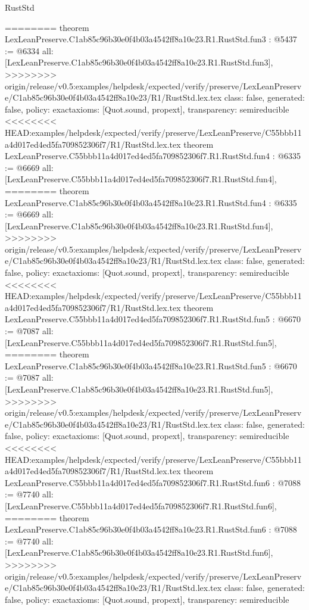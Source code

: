 \begin{lexlean}{RustStd}
\begin{coremodule}
{\begin{coremodule}
{{{{{{========
theorem LexLeanPreserve.C1ab85c96b30e0f4b03a4542ff8a10e23.R1.RustStd.fun3 : @5437 := @6334 {
  all: [LexLeanPreserve.C1ab85c96b30e0f4b03a4542ff8a10e23.R1.RustStd.fun3],
>>>>>>>> origin/release/v0.5:examples/helpdesk/expected/verify/preserve/LexLeanPreserve/C1ab85c96b30e0f4b03a4542ff8a10e23/R1/RustStd.lex.tex
  class: false,
  generated: false,
  policy: exact{axioms: [Quot.sound, propext]},
  transparency: semireducible
}
<<<<<<<< HEAD:examples/helpdesk/expected/verify/preserve/LexLeanPreserve/C55bbb11a4d017ed4ed5fa709852306f7/R1/RustStd.lex.tex
theorem LexLeanPreserve.C55bbb11a4d017ed4ed5fa709852306f7.R1.RustStd.fun4 : @6335 := @6669 {
  all: [LexLeanPreserve.C55bbb11a4d017ed4ed5fa709852306f7.R1.RustStd.fun4],
========
theorem LexLeanPreserve.C1ab85c96b30e0f4b03a4542ff8a10e23.R1.RustStd.fun4 : @6335 := @6669 {
  all: [LexLeanPreserve.C1ab85c96b30e0f4b03a4542ff8a10e23.R1.RustStd.fun4],
>>>>>>>> origin/release/v0.5:examples/helpdesk/expected/verify/preserve/LexLeanPreserve/C1ab85c96b30e0f4b03a4542ff8a10e23/R1/RustStd.lex.tex
  class: false,
  generated: false,
  policy: exact{axioms: [Quot.sound, propext]},
  transparency: semireducible
}
<<<<<<<< HEAD:examples/helpdesk/expected/verify/preserve/LexLeanPreserve/C55bbb11a4d017ed4ed5fa709852306f7/R1/RustStd.lex.tex
theorem LexLeanPreserve.C55bbb11a4d017ed4ed5fa709852306f7.R1.RustStd.fun5 : @6670 := @7087 {
  all: [LexLeanPreserve.C55bbb11a4d017ed4ed5fa709852306f7.R1.RustStd.fun5],
========
theorem LexLeanPreserve.C1ab85c96b30e0f4b03a4542ff8a10e23.R1.RustStd.fun5 : @6670 := @7087 {
  all: [LexLeanPreserve.C1ab85c96b30e0f4b03a4542ff8a10e23.R1.RustStd.fun5],
>>>>>>>> origin/release/v0.5:examples/helpdesk/expected/verify/preserve/LexLeanPreserve/C1ab85c96b30e0f4b03a4542ff8a10e23/R1/RustStd.lex.tex
  class: false,
  generated: false,
  policy: exact{axioms: [Quot.sound, propext]},
  transparency: semireducible
}
<<<<<<<< HEAD:examples/helpdesk/expected/verify/preserve/LexLeanPreserve/C55bbb11a4d017ed4ed5fa709852306f7/R1/RustStd.lex.tex
theorem LexLeanPreserve.C55bbb11a4d017ed4ed5fa709852306f7.R1.RustStd.fun6 : @7088 := @7740 {
  all: [LexLeanPreserve.C55bbb11a4d017ed4ed5fa709852306f7.R1.RustStd.fun6],
========
theorem LexLeanPreserve.C1ab85c96b30e0f4b03a4542ff8a10e23.R1.RustStd.fun6 : @7088 := @7740 {
  all: [LexLeanPreserve.C1ab85c96b30e0f4b03a4542ff8a10e23.R1.RustStd.fun6],
>>>>>>>> origin/release/v0.5:examples/helpdesk/expected/verify/preserve/LexLeanPreserve/C1ab85c96b30e0f4b03a4542ff8a10e23/R1/RustStd.lex.tex
  class: false,
  generated: false,
  policy: exact{axioms: [Quot.sound, propext]},
  transparency: semireducible
}}}}}}}}}}
\end{coremodule}}
\end{coremodule}
\end{lexlean}
